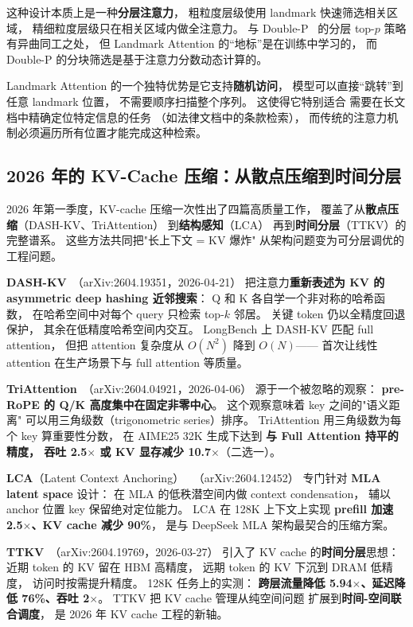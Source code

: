 这种设计本质上是一种\textbf{分层注意力}，
粗粒度层级使用 landmark 快速筛选相关区域，
精细粒度层级只在相关区域内做全注意力。
与 Double-P~\cite{doublep2026} 的分层 top-$p$ 策略有异曲同工之处，
但 Landmark Attention 的“地标”是在训练中学习的，
而 Double-P 的分块筛选是基于注意力分数动态计算的。

Landmark Attention 的一个独特优势是它支持\textbf{随机访问}，
模型可以直接“跳转”到任意 landmark 位置，
不需要顺序扫描整个序列。
这使得它特别适合
需要在长文档中精确定位特定信息的任务
（如法律文档中的条款检索），
而传统的注意力机制必须遍历所有位置才能完成这种检索。

\subsection{2026 年的 KV-Cache 压缩：从散点压缩到时间分层}
\label{sec:kv-compression-2026}

2026 年第一季度，KV-cache 压缩一次性出了四篇高质量工作，
覆盖了从\textbf{散点压缩}（DASH-KV、TriAttention）
到\textbf{结构感知}（LCA）
再到\textbf{时间分层}（TTKV）的完整谱系。
这些方法共同把"长上下文 = KV 爆炸"
从架构问题变为可分层调优的工程问题。

\textbf{DASH-KV}~\cite{dashkv2026}（arXiv:2604.19351，2026-04-21）
把注意力\textbf{重新表述为 KV 的 asymmetric deep hashing
近邻搜索}：
Q 和 K 各自学一个非对称的哈希函数，
在哈希空间中对每个 query 只检索 top-$k$ 邻居。
关键 token 仍以全精度回退保护，
其余在低精度哈希空间内交互。
LongBench 上 DASH-KV 匹配 full attention，
但把 attention 复杂度从 $O(N^2)$ 降到 \textbf{$O(N)$}——
首次让线性 attention 在生产场景下与 full attention 等质量。

\textbf{TriAttention}~\cite{triattention2026}（arXiv:2604.04921，2026-04-06）
源于一个被忽略的观察：
\textbf{pre-RoPE 的 Q/K 高度集中在固定非零中心}。
这个观察意味着 key 之间的"语义距离"
可以用三角级数（trigonometric series）排序。
TriAttention 用三角级数为每个 key 算重要性分数，
在 AIME25 32K 生成下达到
\textbf{与 Full Attention 持平的精度，
吞吐 2.5$\times$ 或 KV 显存减少 10.7$\times$}（二选一）。

\textbf{LCA}（Latent Context Anchoring）~\cite{lcakv2026}
（arXiv:2604.12452）
专门针对 \textbf{MLA latent space} 设计：
在 MLA 的低秩潜空间内做 context condensation，
辅以 anchor 位置 key 保留绝对定位能力。
LCA 在 128K 上下文上实现
\textbf{prefill 加速 2.5$\times$、KV cache 减少 90\%}，
是与 DeepSeek MLA 架构最契合的压缩方案。

\textbf{TTKV}~\cite{ttkv2026}（arXiv:2604.19769，2026-03-27）
引入了 KV cache 的\textbf{时间分层}思想：
近期 token 的 KV 留在 HBM 高精度，
远期 token 的 KV 下沉到 DRAM 低精度，
访问时按需提升精度。
128K 任务上的实测：
\textbf{跨层流量降低 5.94$\times$、延迟降低 76\%、吞吐 2$\times$}。
TTKV 把 KV cache 管理从纯空间问题
扩展到\textbf{时间-空间联合调度}，
是 2026 年 KV cache 工程的新轴。

